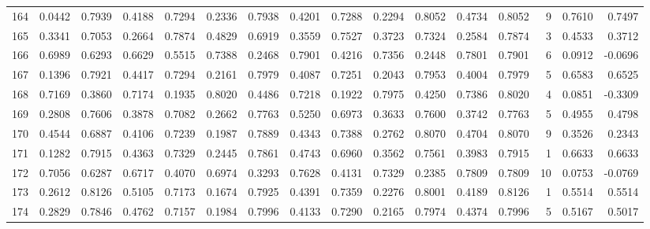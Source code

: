 \begin{tabular}{lrrrrrrrrrrrrrrr}
164 &      0.0442 &  0.7939 &  0.4188 &  0.7294 &  0.2336 &  0.7938 &  0.4201 &  0.7288 &  0.2294 &  0.8052 &   0.4734 &     0.8052 &      9 &                    0.7610 &                     0.7497 \\
165 &      0.3341 &  0.7053 &  0.2664 &  0.7874 &  0.4829 &  0.6919 &  0.3559 &  0.7527 &  0.3723 &  0.7324 &   0.2584 &     0.7874 &      3 &                    0.4533 &                     0.3712 \\
166 &      0.6989 &  0.6293 &  0.6629 &  0.5515 &  0.7388 &  0.2468 &  0.7901 &  0.4216 &  0.7356 &  0.2448 &   0.7801 &     0.7901 &      6 &                    0.0912 &                    -0.0696 \\
167 &      0.1396 &  0.7921 &  0.4417 &  0.7294 &  0.2161 &  0.7979 &  0.4087 &  0.7251 &  0.2043 &  0.7953 &   0.4004 &     0.7979 &      5 &                    0.6583 &                     0.6525 \\
168 &      0.7169 &  0.3860 &  0.7174 &  0.1935 &  0.8020 &  0.4486 &  0.7218 &  0.1922 &  0.7975 &  0.4250 &   0.7386 &     0.8020 &      4 &                    0.0851 &                    -0.3309 \\
169 &      0.2808 &  0.7606 &  0.3878 &  0.7082 &  0.2662 &  0.7763 &  0.5250 &  0.6973 &  0.3633 &  0.7600 &   0.3742 &     0.7763 &      5 &                    0.4955 &                     0.4798 \\
170 &      0.4544 &  0.6887 &  0.4106 &  0.7239 &  0.1987 &  0.7889 &  0.4343 &  0.7388 &  0.2762 &  0.8070 &   0.4704 &     0.8070 &      9 &                    0.3526 &                     0.2343 \\
171 &      0.1282 &  0.7915 &  0.4363 &  0.7329 &  0.2445 &  0.7861 &  0.4743 &  0.6960 &  0.3562 &  0.7561 &   0.3983 &     0.7915 &      1 &                    0.6633 &                     0.6633 \\
172 &      0.7056 &  0.6287 &  0.6717 &  0.4070 &  0.6974 &  0.3293 &  0.7628 &  0.4131 &  0.7329 &  0.2385 &   0.7809 &     0.7809 &     10 &                    0.0753 &                    -0.0769 \\
173 &      0.2612 &  0.8126 &  0.5105 &  0.7173 &  0.1674 &  0.7925 &  0.4391 &  0.7359 &  0.2276 &  0.8001 &   0.4189 &     0.8126 &      1 &                    0.5514 &                     0.5514 \\
174 &      0.2829 &  0.7846 &  0.4762 &  0.7157 &  0.1984 &  0.7996 &  0.4133 &  0.7290 &  0.2165 &  0.7974 &   0.4374 &     0.7996 &      5 &                    0.5167 &                     0.5017 \\

\end{tabular}
